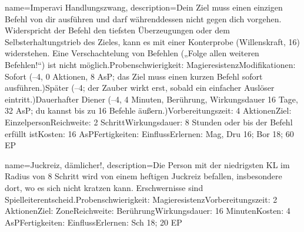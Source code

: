 {
    name={Imperavi Handlungszwang},
    description={Dein Ziel muss einen einzigen Befehl von dir ausführen und darf währenddessen nicht gegen dich vorgehen. Widerspricht der Befehl den tiefsten Überzeugungen oder dem Selbsterhaltungstrieb des Zieles, kann es mit einer Konterprobe (Willenskraft, 16) widerstehen. Eine Verschachtelung von Befehlen („Folge allen weiteren Befehlen!“) ist nicht möglich.\newline Probenschwierigkeit: Magieresistenz\newline Modifikationen: Sofort (–4, 0 Aktionen, 8 AsP; das Ziel muss einen kurzen Befehl sofort ausführen.)\newline Später (–4; der Zauber wirkt erst, sobald ein einfacher Auslöser eintritt.)\newline Dauerhafter Diener (–4, 4 Minuten, Berührung, Wirkungsdauer 16 Tage, 32 AsP; du kannst bis zu 16 Befehle äußern.)\newline Vorbereitungszeit: 4 Aktionen\newline Ziel: Einzelperson\newline Reichweite: 2 Schritt\newline Wirkungsdauer: 8 Stunden oder bis der Befehl erfüllt ist\newline Kosten: 16 AsP\newline Fertigkeiten: Einfluss\newline Erlernen: Mag, Dru 16; Bor 18; 60 EP}
}


{
    name={Juckreiz, dämlicher!},
    description={Die Person mit der niedrigsten KL im Radius von 8 Schritt wird von einem heftigen Juckreiz befallen, insbesondere dort, wo es sich nicht kratzen kann. Erschwernisse sind Spielleiterentscheid.\newline Probenschwierigkeit: Magieresistenz\newline Vorbereitungszeit: 2 Aktionen\newline Ziel: Zone\newline Reichweite: Berührung\newline Wirkungsdauer: 16 Minuten\newline Kosten: 4 AsP\newline Fertigkeiten: Einfluss\newline Erlernen: Sch 18; 20 EP}
}


